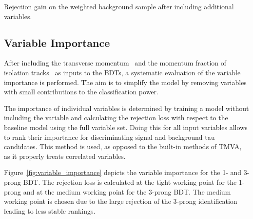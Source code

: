 \begin{table}[htb]
  \centering
  {\small}
  \caption{Rejection gain on the weighted background sample after including
    additional variables.}
  \label{tab:bdt_new_variables}
\end{table}

\subsection{Variable Importance}
\label{sec:bdt_var_importance}

After including the transverse momentum~ and
the momentum fraction of isolation tracks~ as
inputs to the BDTs, a systematic evaluation of the variable importance is
performed. The aim is to simplify the model by removing variables with small
contributions to the classification power.

The importance of individual variables is determined by training a model without
including the variable and calculating the rejection loss with respect to the
baseline model using the full variable set. Doing this for all input variables
allows to rank their importance for discriminating signal and background tau
candidates. This method is used, as opposed to the built-in methods of TMVA, as
it properly treats correlated variables.

Figure~\ref{fig:variable_importance} depicts the variable importance for the 1-
and 3-prong BDT. The rejection loss is calculated at the tight working point for
the 1-prong and at the medium working point for the 3-prong BDT. The medium
working point is chosen due to the large rejection of the 3-prong identification
leading to less stable rankings.

